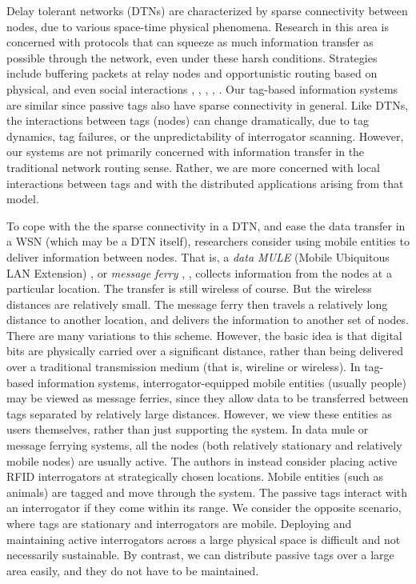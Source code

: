 Delay tolerant networks (DTNs) \cite{2003 Fall} are characterized by sparse connectivity between nodes, due to various space-time physical phenomena. Research in this area is concerned with protocols that can squeeze as much information transfer as possible through the network, even under these harsh conditions. Strategies include buffering packets at relay nodes and opportunistic routing based on physical, and even social interactions \cite{2004 Fall}, \cite{2006 Zhang}, \cite{2007 Jones}, \cite{2007 Daly}, \cite{2011 Fabbri}. Our tag-based information systems are similar since passive tags also have sparse connectivity in general. Like DTNs, the interactions between tags (nodes) can change dramatically, due to tag dynamics, tag failures, or the unpredictability of interrogator scanning. However, our systems are not primarily concerned with information transfer in the traditional network routing sense. Rather, we are more concerned with local interactions between tags and with the distributed applications arising from that model.

To cope with the the sparse connectivity in a DTN, and ease the data transfer in a WSN (which may be a DTN itself), researchers consider using mobile entities to deliver information between nodes. That is, a \emph{data MULE} (Mobile Ubiquitous LAN Extension) \cite{2003 Shah}, \cite{2005 Jea} or \emph{message ferry} \cite{2003 Zhao}, \cite{2004 Zhao}, \cite{2005 Zhao} collects information from the nodes at a particular location. The transfer is still wireless of course. But the wireless distances are relatively small. The message ferry then travels a relatively long distance to another location, and delivers the information to another set of nodes. There are many variations to this scheme. However, the basic idea is that digital bits are physically carried over a significant distance, rather than being delivered over a traditional 
transmission medium (that is, wireline or wireless). In tag-based information systems, interrogator-equipped mobile entities (usually people) may be viewed as message ferries, since they allow data to be transferred between tags separated by relatively large distances. However, we view these entities as users themselves, rather than just supporting the system. In data mule or message ferrying systems, all the nodes (both relatively stationary and relatively mobile nodes) are usually active. The authors in \cite{2009 Yang} instead consider placing active RFID interrogators at strategically chosen locations. Mobile entities (such as animals) are tagged and move through the system. The passive tags interact with an interrogator if they come within its range. We consider the opposite scenario, where tags are stationary and interrogators are mobile. Deploying and maintaining active interrogators across a large physical space is difficult and not necessarily sustainable. By contrast, we can distribute passive tags over a large area easily, and they do not have to be maintained. 

